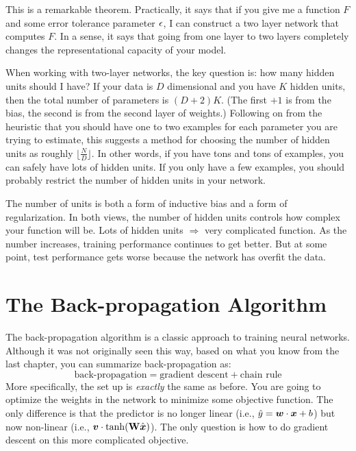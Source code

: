 This is a remarkable theorem.  Practically, it says that if you give
me a function $F$ and some error tolerance parameter $\epsilon$, I can
construct a two layer network that computes $F$.  In a sense, it says
that going from one layer to two layers completely changes the
representational capacity of your model.

When working with two-layer networks, the key question is: how many
hidden units should I have?  If your data is $D$ dimensional and you
have $K$ hidden units, then the total number of parameters is
$(D+2)K$.  (The first $+1$ is from the bias, the second is from the
second layer of weights.)  Following on from the heuristic that you
should have one to two examples for each parameter you are trying to
estimate, this suggests a method for choosing the number of hidden
units as roughly $\lfloor \frac N D \rfloor$.  In other words, if you
have tons and tons of examples, you can safely have lots of hidden
units.  If you only have a few examples, you should probably restrict
the number of hidden units in your network.

The number of units is both a form of inductive bias and a form of
regularization.  In both views, the number of hidden units controls how
complex your function will be.  Lots of hidden units $\Rightarrow$
very complicated function.  %
As the number increases, training performance continues
to get better.  But at some point, test performance gets worse because
the network has overfit the data.

\section{The Back-propagation Algorithm}

The back-propagation algorithm is a classic approach to training
neural networks.  Although it was not originally seen this way, based
on what you know from the last chapter, you can summarize
back-propagation as:
%
\begin{equation}
\text{back-propagation} = \text{gradient descent} + \text{chain rule}
\end{equation}
%
More specifically, the set up is \emph{exactly} the same as before.
You are going to optimize the weights in the network to minimize some
objective function.  The only difference is that the predictor is no
longer linear (i.e., $\hat y = {\boldsymbol{w}} \cdot {\boldsymbol{x}}+b$) but now non-linear
(i.e., $\boldsymbol{v} \cdot \tanh( \text{\bf W} \hat{{\boldsymbol{x}}} )$).  The only question
is how to do gradient descent on this more complicated objective.

